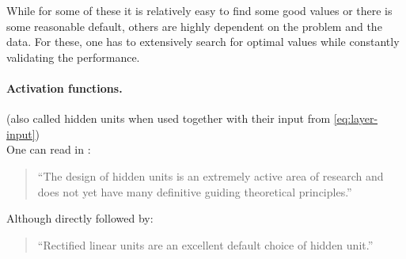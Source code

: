 While for some of these it is relatively easy to find some good values or there is some reasonable default, others are highly dependent on the problem and the data. For these, one has to extensively search for optimal values while constantly validating the performance. 

\paragraph{Activation functions.}
(also called hidden units when used together with their input from \eqref{eq:layer-input}) \\
One can read in \cite[p.\,191]{Goodfellow-et-al-2016}:
\begin{quote}
	``The design of hidden units is an extremely active area of research and does not yet have many definitive guiding theoretical principles.''
\end{quote}

\begin{figure}
	\vspace{-1em}
\end{figure}

Although directly followed by:
\begin{quote}
	``Rectified linear units are an excellent default choice of hidden unit.''
\end{quote}

